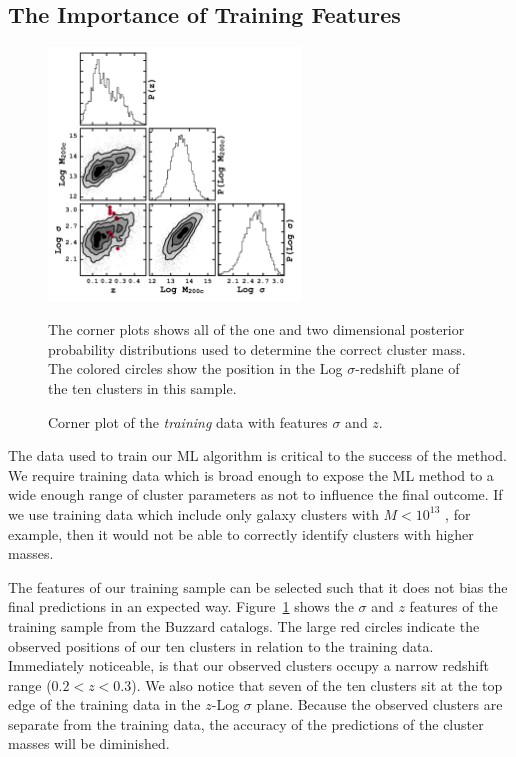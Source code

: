 \subsection{The Importance of Training Features}\label{2sec: training features}
\begin{figure}[t]
	\begin{center}
		\includegraphics[width=0.6\textwidth]{figures2/buzzardCorner.pdf}
	\end{center}
	\caption{Corner plot of the \emph{training} data with features $\sigma$ and $z$.} 
	The corner plots shows all of the one and two dimensional posterior probability distributions used to determine the correct cluster mass. The colored circles show the position in the Log $\sigma$-redshift plane of the ten clusters in this sample.
	\label{2fig:buzzardCorner}
\end{figure}

The data used to train our ML algorithm is critical to the success of the method. We require training data which is broad enough to expose the ML method to a wide enough range of cluster parameters as not to influence the final outcome. If we use training data which include only galaxy clusters with $M < 10^{13}$ \Msol, for example, then it would not be able to correctly identify clusters with higher masses. 

The features of our training sample can be selected such that it does not bias the final predictions in an expected way. Figure~\ref{2fig:buzzardCorner} shows the $\sigma$ and $z$ features of the training sample from the Buzzard catalogs. The large red circles indicate the observed positions of our ten clusters in relation to the training data. Immediately noticeable, is that our observed clusters occupy a narrow redshift range ($0.2< z <0.3$). We also notice that seven of the ten clusters sit at the top edge of the training data in the $z$-Log $\sigma$ plane. Because the observed clusters are separate from the training data, the accuracy of the predictions of the cluster masses will be diminished. 

